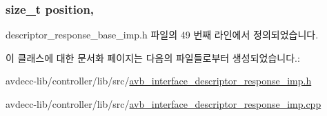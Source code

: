 \subsubsection[{\texorpdfstring{position}{position}}]{\setlength{\rightskip}{0pt plus 5cm}size\+\_\+t position\hspace{0.3cm}{\ttfamily [protected]}, {\ttfamily [inherited]}}\hypertarget{classavdecc__lib_1_1descriptor__response__base__imp_a7a04afe5347934be732ec70a70bd0a28}{}\label{classavdecc__lib_1_1descriptor__response__base__imp_a7a04afe5347934be732ec70a70bd0a28}


descriptor\+\_\+response\+\_\+base\+\_\+imp.\+h 파일의 49 번째 라인에서 정의되었습니다.



이 클래스에 대한 문서화 페이지는 다음의 파일들로부터 생성되었습니다.\+:\begin{DoxyCompactItemize}
\item 
avdecc-\/lib/controller/lib/src/\hyperlink{avb__interface__descriptor__response__imp_8h}{avb\+\_\+interface\+\_\+descriptor\+\_\+response\+\_\+imp.\+h}\item 
avdecc-\/lib/controller/lib/src/\hyperlink{avb__interface__descriptor__response__imp_8cpp}{avb\+\_\+interface\+\_\+descriptor\+\_\+response\+\_\+imp.\+cpp}\end{DoxyCompactItemize}
